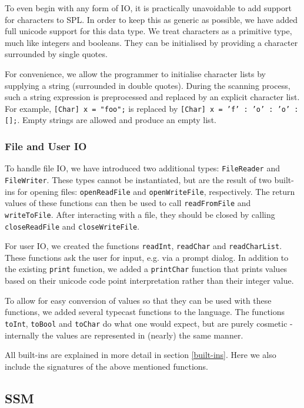 \documentclass[a4paper]{article}
\begin{document}
To even begin with any form of IO, it is practically unavoidable to add support for characters to SPL. In order to keep this as generic as possible, we have added full unicode support for this data type. We treat characters as a primitive type, much like integers and booleans. They can be initialised by providing a character surrounded by single quotes.

For convenience, we allow the programmer to initialise character lists by supplying a string (surrounded in double quotes). During the scanning process, such a string expression is preprocessed and replaced by an explicit character list. For example, {\tt [Char] x = "foo";} is replaced by {\tt [Char] x = 'f' : 'o' : 'o' : [];}. Empty strings are allowed and produce an empty list.

\subsubsection{File and User IO}

To handle file IO, we have introduced two additional types: \texttt{FileReader} and \texttt{FileWriter}. These types cannot be instantiated, but are the result of two built-ins for opening files: \texttt{openReadFile} and \texttt{openWriteFile}, respectively. The return values of these functions can then be used to call \texttt{readFromFile} and \texttt{writeToFile}. After interacting with a file, they should be closed by calling \texttt{closeReadFile} and \texttt{closeWriteFile}.

For user IO, we created the functions \texttt{readInt}, \texttt{readChar} and \texttt{readCharList}. These functions ask the user for input, e.g. via a prompt dialog. In addition to the existing \texttt{print} function, we added a \texttt{printChar} function that prints values based on their unicode code point interpretation rather than their integer value.

To allow for easy conversion of values so that they can be used with these functions, we added several typecast functions to the language. The functions \texttt{toInt}, \texttt{toBool} and \texttt{toChar} do what one would expect, but are purely cosmetic - internally the values are represented in (nearly) the same manner.

All built-ins are explained in more detail in section \ref{built-ins}. Here we also include the signatures of the above mentioned functions.

\subsection{SSM}
\end{document}
